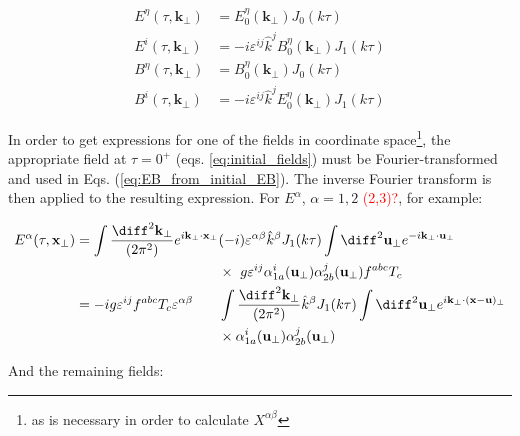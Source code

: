 \begin{subequations} \label{eq:EB_from_initial_EB}
	\begin{align}
		E^\eta(\tau,\mathbf{k}_\perp) & = E^\eta_0 (\mathbf{k}_\perp) J_0 (k \tau) \\
		E^i(\tau,\mathbf{k}_\perp) & = -i \varepsilon^{ij} \hat{k}^j B_0^\eta (\mathbf{k}_\perp) J_1 (k \tau) \\
		B^\eta(\tau,\mathbf{k}_\perp) & = B^\eta_0 (\mathbf{k}_\perp) J_0 (k \tau) \\
		B^i(\tau,\mathbf{k}_\perp) & = -i \varepsilon^{ij} \hat{k}^j E_0^\eta (\mathbf{k}_\perp) J_1 (k \tau)
	\end{align}
\end{subequations}

In order to get expressions for one of the fields in coordinate  space\textcolor{red}{\footnote{as is necessary in order to calculate $X^{\alpha \beta}$}}, the appropriate field at $\tau=0^+$ (eqs. \ref{eq:initial_fields}) must be Fourier-transformed and used in Eqs. (\ref{eq:EB_from_initial_EB}). The inverse Fourier transform is then applied to the resulting expression. For $E^\alpha$, $\alpha=1,2$ \textcolor{red}{(2,3)?}, for example:

\begin{equation}
	\begin{alignedat}{2}
		E^\alpha (\tau,\mathbf{x}_\perp) & =  \int \frac{\diff^2 \mathbf{k}_\perp}{(2\pi^2)} e^{i \mathbf{k}_\perp \cdot \mathbf{x}_\perp} & & (-i)   \varepsilon^{\alpha \beta} \hat{k}^\beta J_1 (k \tau)  \int \diff^2 \mathbf{u}_\perp e^{-i \mathbf{k}_\perp \cdot \mathbf{u}_\perp} \\
		& ~ & & \times ~ g \varepsilon^{ij} \alpha^i_{1a} (\mathbf{u}_\perp) \alpha^j_{2b}(\mathbf{u}_\perp) f^{abc} T_c \\
		& = -ig \varepsilon^{ij} f^{abc} T_c \varepsilon^{\alpha \beta} & & \int  \frac{\diff^2 \mathbf{k}_\perp}{(2\pi^2)} \hat{k}^\beta J_1 (k \tau) \int \diff^2 \mathbf{u}_\perp e^{i \mathbf{k}_\perp \cdot (\mathbf{x} - \mathbf{u})_\perp}  \\
		& ~ & & \times \alpha^i_{1a} (\mathbf{u}_\perp) \alpha^j_{2b}(\mathbf{u}_\perp)
	\end{alignedat}
\end{equation}

And the remaining fields:

